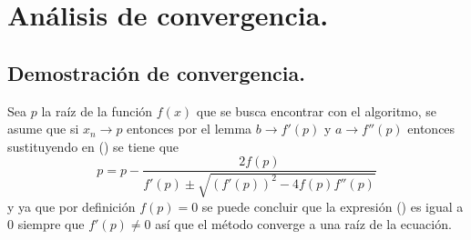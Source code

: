 \section{Análisis de convergencia.}
\subsection{Demostración de convergencia.}
Sea $p$ la raíz de la función $f(x)$ que se busca encontrar con el algoritmo,
se asume que si $x_n \rightarrow p$ entonces por el lemma  $b \rightarrow f'(p)$
y $a \rightarrow f''(p)$ entonces sustituyendo en () se tiene que
\begin{equation}
    \label{muller_convergence_eq}
    p = p - \frac{2f(p)}{f'(p)\pm\sqrt{\left(f'(p)\right)^2-4f(p)f''(p)}}
\end{equation}
y ya que por definición $f(p)=0$ se puede concluir que la expresión ()
es igual a $0$ siempre que $f'(p) \neq 0$ así que el método converge a una raíz de la ecuación.

